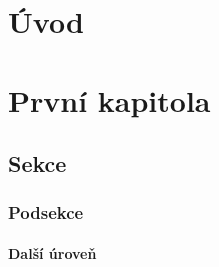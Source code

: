 \documentclass[oneside,a4paper,12pt]{book}
\begin{document}
\frontmatter
{}

\begin{abstract}
Abstrakt v rozsahu 200 slov je stručný výtah práce. Slouží především jako pomoc
čtenáři rychle se zorientovat v dané práci, obsahuje stručnou charakteristiku
práce, její cíle a použité metody. Abstrakt obsahuje také shrnutí výsledků
práce.
\SavedKeywords
\end{abstract}

\begin{abstract}[Abstract]
An abstract of 200 words is a brief summary of the work. It serves primarily  
a reader to quickly orientate in the work, contains a brief description of the
work, its objectives and methods used. The abstract also contains a summary of
the results of the work.
\end{abstract}

\tableofcontents
\chapter{Úvod}
\mainmatter
\chapter{První kapitola}
\section{Sekce}
\subsection{Podsekce}
\subsubsection{Další úroveň}
\lipsum[1-3]
\end{document}
